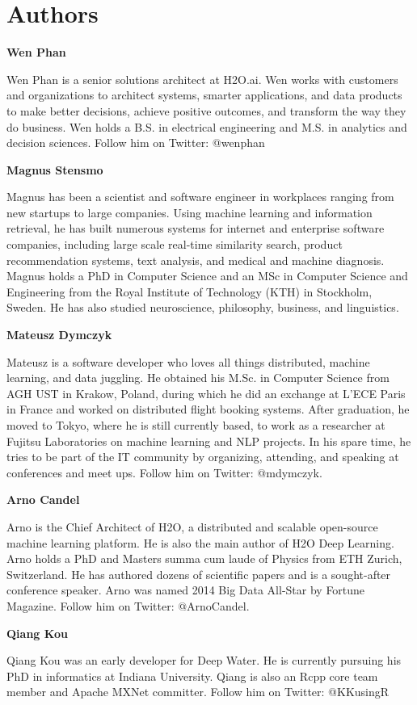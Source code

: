 \newpage
\section{Authors}

\textbf{Wen Phan}

Wen Phan is a senior solutions architect at H2O.ai. Wen works with customers and organizations to architect systems, smarter applications, and data products to make better decisions, achieve positive outcomes, and transform the way they do business. Wen holds a B.S. in electrical engineering and M.S. in analytics and decision sciences.  Follow him on Twitter: @wenphan

\textbf{Magnus Stensmo}

Magnus has been a scientist and software engineer in workplaces ranging from new startups to large companies. Using machine learning and information retrieval, he has built numerous systems for internet and enterprise software companies, including large scale real-time similarity search, product recommendation systems, text analysis, and medical and machine diagnosis.  Magnus holds a PhD in Computer Science and an MSc in Computer Science and Engineering from the Royal Institute of Technology (KTH) in Stockholm, Sweden. He has also studied neuroscience, philosophy, business, and linguistics.

\textbf{Mateusz Dymczyk}

Mateusz is a software developer who loves all things distributed, machine learning, and data juggling.  He obtained his M.Sc. in Computer Science from AGH UST in Krakow, Poland, during which he did an exchange at L'ECE Paris in France and worked on distributed flight booking systems. After graduation, he moved to Tokyo, where he is still currently based, to work as a researcher at Fujitsu Laboratories on machine learning and NLP projects. In his spare time, he tries to be part of the IT community by organizing, attending, and speaking at conferences and meet ups.  Follow him on Twitter: @mdymczyk.

\textbf{Arno Candel}

Arno is the Chief Architect of H2O, a distributed and scalable open-source machine learning platform. He is also the main author of H2O Deep Learning. Arno holds a PhD and Masters summa cum laude of Physics from ETH Zurich, Switzerland. He has authored dozens of scientific papers and is a sought-after conference speaker. Arno was named 2014 Big Data All-Star by Fortune Magazine. Follow him on Twitter: @ArnoCandel.

\textbf{Qiang Kou}

Qiang Kou was an early developer for Deep Water.  He is currently pursuing his PhD in informatics at Indiana University.  Qiang is also an Rcpp core team member and Apache MXNet committer.  Follow him on Twitter: @KKusingR


